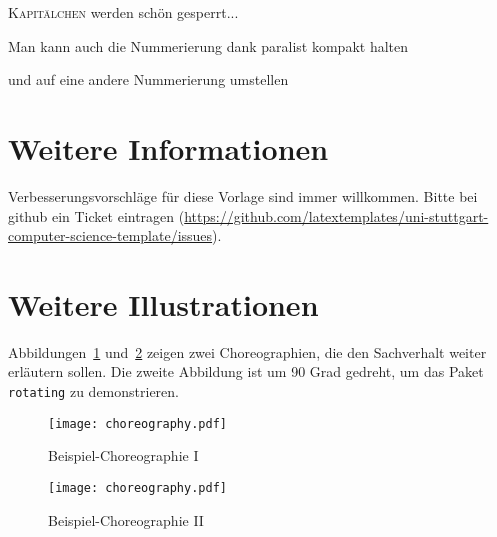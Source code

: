 \textsc{Kapitälchen} werden schön gesperrt...

\begin{compactenum}[I]
\item Man kann auch die Nummerierung dank paralist kompakt halten
\item und auf eine andere Nummerierung umstellen
\end{compactenum}

\section{Weitere Informationen}
Verbesserungsvorschläge für diese Vorlage sind immer willkommen.
Bitte bei github ein Ticket eintragen (\url{https://github.com/latextemplates/uni-stuttgart-computer-science-template/issues}).
\section{Weitere Illustrationen}
Abbildungen~\ref{fig:AnhangsChor} und~\ref{fig:AnhangsChor2} zeigen zwei Choreographien, die den
Sachverhalt weiter erläutern sollen. Die zweite Abbildung ist um 90 Grad gedreht, um das Paket
\texttt{rotating} zu demonstrieren.

\begin{figure}
  \centering
  \texttt{[image: choreography.pdf]}
  \caption{Beispiel-Choreographie I}
  \label{fig:AnhangsChor}
\end{figure}

\begin{landscape}
\begin{figure}
  \centering
  \texttt{[image: choreography.pdf]}
  \caption{Beispiel-Choreographie II}
  \label{fig:AnhangsChor2}
\end{figure}
\end{landscape}
